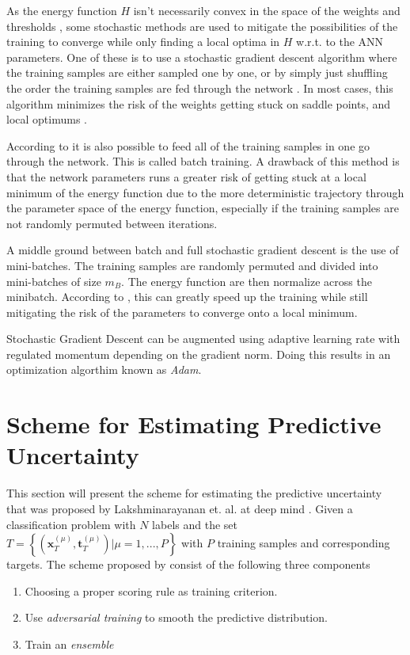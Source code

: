 As the energy function $H$ isn't necessarily convex in the space of the weights and thresholds \cite{kingma2014adam}, some stochastic methods are used to mitigate the possibilities of the training to converge while only finding a local optima in $H$ w.r.t. to the ANN parameters. One of these is to use a stochastic gradient descent algorithm where the training samples are either sampled one by one, or by simply just shuffling the order the training samples are fed through the network \cite{mehligcourseslides}. In most cases, this algorithm minimizes the risk of the weights getting stuck on saddle points, and local optimums \cite{lecun2015deep}.

According to \cite{mehligcourseslides} it is also possible to feed all of the training samples in one go through the network. This is called batch training. A drawback of this method is that the network parameters runs a greater risk of getting stuck at a local minimum of the energy function due to the more deterministic trajectory through the parameter space of the energy function, especially if the training samples are not randomly permuted between iterations.

A middle ground between batch and full stochastic gradient descent is the use of mini-batches. The training samples are randomly permuted and divided into mini-batches of size $m_B$. The energy function are then normalize across the minibatch. According to \cite{mehligcourseslides}, this can greatly speed up the training while still mitigating the risk of the parameters to converge onto a local minimum.

Stochastic Gradient Descent can be augmented using adaptive learning rate with regulated momentum depending on the gradient norm. Doing this results in an optimization algorthim known as \textit{Adam}\cite{kingma2014adam}.

\section{Scheme for Estimating Predictive Uncertainty}
\label{sect:uncertainty}
This section will present the scheme for estimating the predictive uncertainty that was proposed by Lakshminarayanan et. al. at deep mind \cite{lakshminarayanan2017simple}. Given a classification problem with $N$ labels and the set $T = \left\{(\bm{x}_T^{(\mu)},\bm{t}_T^{(\mu)}) | \mu = 1,...,P\right\}$ with $P$ training samples and corresponding targets. The scheme proposed by \cite{lakshminarayanan2017simple} consist of the following three components
\begin{enumerate}
    \item Choosing a proper scoring rule as training criterion.
    \item Use \textit{adversarial training} to smooth the predictive distribution.
    \item Train an \textit{ensemble}
\end{enumerate}

